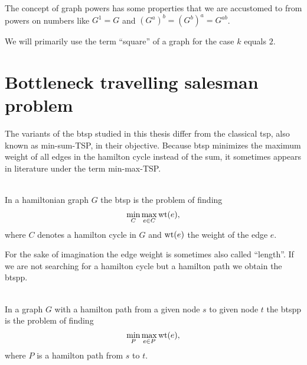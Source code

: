 The concept of graph powers has some properties that we are accustomed to from powers on numbers like \(G^1 = G\) and \({(G^a)}^b = {(G^b)}^a = G^{ab}\).

We will primarily use the term \enquote{square} of a graph for the case \(k\) equals \(2\).


\section{Bottleneck travelling salesman problem}
The variants of the \gls{btsp} studied in this thesis differ from the classical \gls{tsp}, also known as min-sum-TSP, in their objective. Because \gls{btsp} minimizes the maximum weight of all edges in the hamilton cycle instead of the sum, it sometimes appears in literature under the term min-max-TSP.

\begin{definition}\label{def:btsp}\ \\
  In a hamiltonian graph \(G\) the \gls{btsp} is the problem of finding
  \begin{equation*}
    \min\limits_{C} \max\limits_{e \in C} \textrm{wt}(e),
  \end{equation*}
  where \(C\) denotes a hamilton cycle in \(G\) and \(\textrm{wt}(e)\) the weight of the edge \(e\).
\end{definition}

For the sake of imagination the edge weight is sometimes also called \enquote{length}.
If we are not searching for a hamilton cycle but a hamilton path we obtain the \gls{btspp}.

\begin{definition}\label{def:btspp}\ \\
  In a graph \(G\) with a hamilton path from a given node \(s\) to given node \(t\) the \gls{btspp} is the problem of finding
  \begin{equation*}
    \min\limits_{P} \max\limits_{e \in P} \textrm{wt}(e),
  \end{equation*}
  where \(P\) is a hamilton path from \(s\) to \(t\).
\end{definition}
